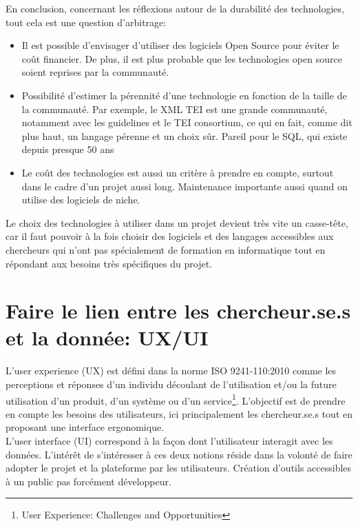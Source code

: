 En conclusion, concernant les réflexions autour de la durabilité des technologies, tout cela est une question d’arbitrage:\\
\begin{itemize}
    \item Il est possible d’envisager d’utiliser des logiciels Open Source pour éviter le coût financier. De plus, il est plus probable que les technologies open source soient reprises par la communauté.
    \item Possibilité d’estimer la pérennité d’une technologie en fonction de la taille de la communauté. Par exemple, le XML TEI est une grande communauté, notamment avec les guidelines et le TEI consortium, ce qui en fait, comme dit plus haut, un langage pérenne et un choix sûr. Pareil pour le SQL, qui existe depuis presque 50 ans
    \item Le coût des technologies est aussi un critère à prendre en compte, surtout dans le cadre d’un projet aussi long. Maintenance importante aussi quand on utilise des logiciels de niche. \\
    
\end{itemize}


Le choix des technologies à utiliser dans un projet devient très vite un casse-tête, car il faut pouvoir à la fois choisir des logiciels et des langages accessibles aux chercheurs qui n’ont pas spécialement de formation en informatique tout en répondant aux besoins très spécifiques du projet.


    \section{Faire le lien entre les chercheur.se.s et la donnée: UX/UI}

L’user experience (UX) est défini dans la norme ISO 9241-110:2010 comme les perceptions et réponses d’un individu découlant de l’utilisation et/ou la future utilisation d’un produit, d’un système ou d’un service\footnote{User Experience: Challenges and Opportunities}. L’objectif est de prendre en compte les besoins des utilisateurs, ici principalement les chercheur.se.s tout en proposant une interface ergonomique.\\ 
L’user interface (UI) correspond à la façon dont l’utilisateur interagit avec les données. 
L’intérêt de s’intéresser à ces deux notions réside dans la volonté de faire adopter le projet et la plateforme par les utilisateurs. Création d’outils accessibles à un public pas forcément développeur.

